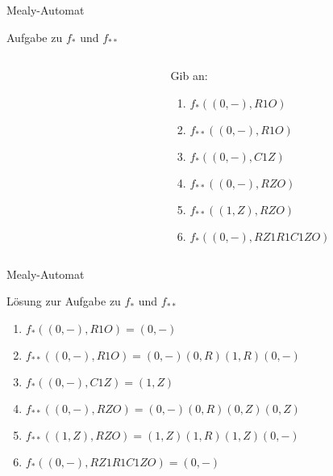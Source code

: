 \begin{frame}[fragile]{Mealy-Automat}
\begin{exampleblock}{Aufgabe zu $f_{\ast}$ und $f_{\ast\ast}$}
\begin{columns}
\begin{column}{0.6\textwidth}
\begin{figure}[ht]
\end{figure}
			\end{column}
			\begin{column}{0.375\textwidth}
			\small
				Gib an:
				\begin{enumerate}
					\item $f_{\ast}((0,-), R1O)$
					\item $f_{\ast\ast}((0,-), R1O)$
					\item $f_{\ast}((0,-), C1Z)$
					\item $f_{\ast\ast}((0,-), RZO)$
					\item $f_{\ast\ast}((1,Z), RZO)$
					\item $f_{\ast}((0,-), RZ1R1C1ZO)$
				\end{enumerate}
			\end{column}
		\end{columns}
	\end{exampleblock}
\end{frame}

\begin{frame}{Mealy-Automat}
	\begin{block}{Lösung zur Aufgabe zu $f_{\ast}$ und $f_{\ast\ast}$}
		\begin{enumerate}
					\item $f_{\ast}((0,-), R1O) = (0,-)$
					\item $f_{\ast\ast}((0,-), R1O) = (0,-)(0,R)(1,R)(0,-)$
					\item $f_{\ast}((0,-), C1Z) = (1,Z)$
					\item $f_{\ast\ast}((0,-), RZO) = (0,-)(0,R)(0,Z)(0,Z)$
					\item $f_{\ast\ast}((1,Z), RZO) = (1,Z)(1,R)(1,Z)(0,-)$
					\item $f_{\ast}((0,-), RZ1R1C1ZO)= (0,-)$
				\end{enumerate}
	\end{block}
\end{frame}

